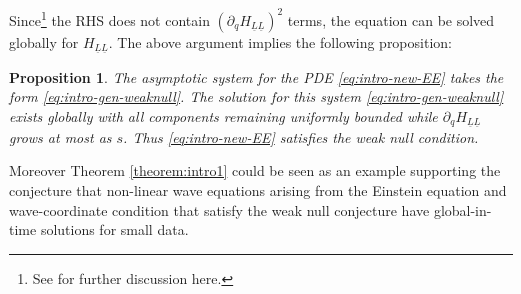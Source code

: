 \documentclass[11pt, a4paper]{amsart}
\numberwithin{equation}{section}
\newtheorem{proposition}[theorem]{Proposition}
\numberwithin{theorem}{section}
\newcommand{\p}{\partial}
\newcommand{\lbar}{\underline{L}}
\begin{document}
Since\footnote{See \cite{lindblad:weaknull} for further discussion here.} the RHS does not contain $(\p_q H_{\lbar \lbar})^2$ terms, the equation can be solved globally for $H_{\lbar \lbar}$. 
The above argument implies the following proposition:
\begin{proposition}
The asymptotic system for the PDE \eqref{eq:intro-new-EE} takes the form \eqref{eq:intro-gen-weaknull}. The solution for this system \eqref{eq:intro-gen-weaknull} exists globally with all components remaining uniformly bounded while $\p_q H_{\lbar \lbar}$ grows at most as $s$. Thus \eqref{eq:intro-new-EE} satisfies the weak null condition.  
\end{proposition}

Moreover Theorem \ref{theorem:intro1} could be seen as an example supporting the conjecture that non-linear wave equations arising from the Einstein equation and wave-coordinate condition that satisfy the weak null conjecture have global-in-time solutions for small data. 
\end{document}
